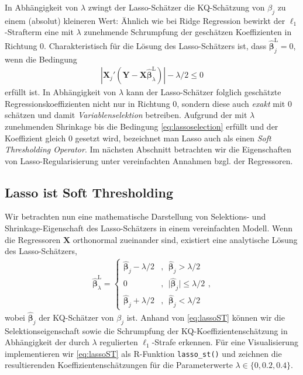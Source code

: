 \documentclass[
  a4paper,
  DIV=11,
  oneside]{scrreprt}
\begin{document}
In Abhängigkeit von \(\lambda\) zwingt der Lasso-Schätzer die
KQ-Schätzung von \(\beta_j\) zu einem (absolut) kleineren Wert: Ähnlich
wie bei Ridge Regression bewirkt der \(\ell_1\)-Strafterm eine mit
\(\lambda\) zunehmende Schrumpfung der geschätzen Koeffizienten in
Richtung 0. Charakteristisch für die Lösung des Lasso-Schätzers ist,
dass \(\widehat{\boldsymbol{\beta}}^{\mathrm{L}}_j = 0\), wenn die
Bedingung \begin{align}
  \left\lvert\boldsymbol{X}_j'(\boldsymbol{Y} - \boldsymbol{X}\widehat{\boldsymbol{\beta}}^{\mathrm{L}}_\lambda)\right\rvert - \lambda/2 \leq 0 \label{eq:lassoselection}
\end{align} erfüllt ist. In Abhängigkeit von \(\lambda\) kann der
Lasso-Schätzer folglich geschätzte Regressionskoeffizienten nicht nur in
Richtung \(0\), sondern diese auch \emph{exakt} mit \(0\) schätzen und
damit \emph{Variablenselektion} betreiben. Aufgrund der mit \(\lambda\)
zunehmenden Shrinkage bis die Bedingung \eqref{eq:lassoselection}
erfüllt und der Koeffizient gleich \(0\) gesetzt wird, bezeichnet man
Lasso auch als einen \emph{Soft Thresholding Operator}. Im nächsten
Abschnitt betrachten wir die Eigenschaften von Lasso-Regularisierung
unter vereinfachten Annahmen bzgl. der Regressoren.

\hypertarget{lasso-ist-soft-thresholding}{%
\subsection{Lasso ist Soft
Thresholding}\label{lasso-ist-soft-thresholding}}

Wir betrachten nun eine mathematische Darstellung von Selektions- und
Shrinkage-Eigenschaft des Lasso-Schätzers in einem vereinfachten Modell.
Wenn die Regressoren \(\boldsymbol{X}\) orthonormal zueinander sind,
existiert eine analytische Lösung des Lasso-Schätzers, \begin{align}
  \widehat{\boldsymbol{\beta}}^{\mathrm{L}}_\lambda =
  \begin{cases}
    \widehat{\boldsymbol{\beta}}_j - \lambda/2 &, \ \ \widehat{\boldsymbol{\beta}}_j > \lambda/2\\
    0 &, \ \ \lvert\widehat{\boldsymbol{\beta}}_j\rvert\leq\lambda/2\\
    \widehat{\boldsymbol{\beta}}_j + \lambda/2 &, \ \ \widehat{\boldsymbol{\beta}}_j < \lambda/2
  \end{cases},\label{eq:lassoST}
\end{align} wobei \(\widehat{\boldsymbol{\beta}}_j\) der KQ-Schätzer von
\(\beta_j\) ist. Anhand von \eqref{eq:lassoST} können wir die
Selektionseigenschaft sowie die Schrumpfung der
KQ-Koeffizientenschätzung in Abhängigkeit der durch \(\lambda\)
regulierten \(\ell_1\)-Strafe erkennen. Für eine Visualisierung
implementieren wir \eqref{eq:lassoST} als R-Funktion
\texttt{lasso\_st()} und zeichnen die resultierenden
Koeffizientenschätzungen für die Parameterwerte
\(\lambda\in\{0, 0.2, 0.4\}\).
\end{document}
